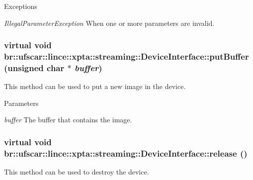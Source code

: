 \begin{DoxyExceptions}{Exceptions}
\item[{\em IllegalParameterException}]When one or more parameters are invalid. \end{DoxyExceptions}
\hypertarget{classbr_1_1ufscar_1_1lince_1_1xpta_1_1streaming_1_1DeviceInterface_af0046c56cb9799f13fe25ae869934ba2}{
\subsubsection[{putBuffer}]{\setlength{\rightskip}{0pt plus 5cm}virtual void br::ufscar::lince::xpta::streaming::DeviceInterface::putBuffer (unsigned char $\ast$ {\em buffer})}}
\label{classbr_1_1ufscar_1_1lince_1_1xpta_1_1streaming_1_1DeviceInterface_af0046c56cb9799f13fe25ae869934ba2}


This method can be used to put a new image in the device. 


\begin{DoxyParams}{Parameters}
\item[{\em buffer}]The buffer that contains the image. \end{DoxyParams}
\hypertarget{classbr_1_1ufscar_1_1lince_1_1xpta_1_1streaming_1_1DeviceInterface_a0e4247104e6f69efd841f4e081adb2b8}{
\subsubsection[{release}]{\setlength{\rightskip}{0pt plus 5cm}virtual void br::ufscar::lince::xpta::streaming::DeviceInterface::release ()}}
\label{classbr_1_1ufscar_1_1lince_1_1xpta_1_1streaming_1_1DeviceInterface_a0e4247104e6f69efd841f4e081adb2b8}


This method can be used to destroy the device. 

